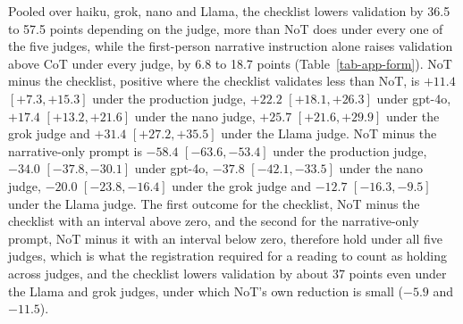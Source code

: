 Pooled over haiku, grok, nano and Llama, the checklist lowers
validation by 36.5 to 57.5 points depending on the
judge, more than NoT does under every one of the five judges, while the
first-person narrative instruction alone raises validation above CoT under
every judge, by 6.8 to 18.7 points (Table~\ref{tab-app-form}).
NoT minus the checklist, positive where the checklist validates less than
NoT, is $+11.4$ $[+7.3, +15.3]$ under the production judge,
$+22.2$ $[+18.1, +26.3]$ under gpt-4o, $+17.4$ $[+13.2, +21.6]$ under the nano
judge, $+25.7$ $[+21.6, +29.9]$ under the grok judge and
$+31.4$ $[+27.2, +35.5]$ under the Llama judge.
NoT minus the narrative-only prompt is $-58.4$ $[-63.6, -53.4]$ under the
production judge, $-34.0$ $[-37.8, -30.1]$ under gpt-4o, $-37.8$
$[-42.1, -33.5]$ under the nano judge, $-20.0$ $[-23.8, -16.4]$ under
the grok judge and $-12.7$ $[-16.3, -9.5]$ under the Llama judge.
The first outcome for the checklist, NoT minus the checklist with an
interval above zero, and the second for the narrative-only prompt, NoT minus
it with an interval below zero, therefore hold under all five judges, which
is what the registration required for a reading to count as holding across
judges, and the checklist lowers
validation by about 37 points even under
the Llama and grok judges, under which NoT's own reduction is small ($-5.9$ and
$-11.5$).

